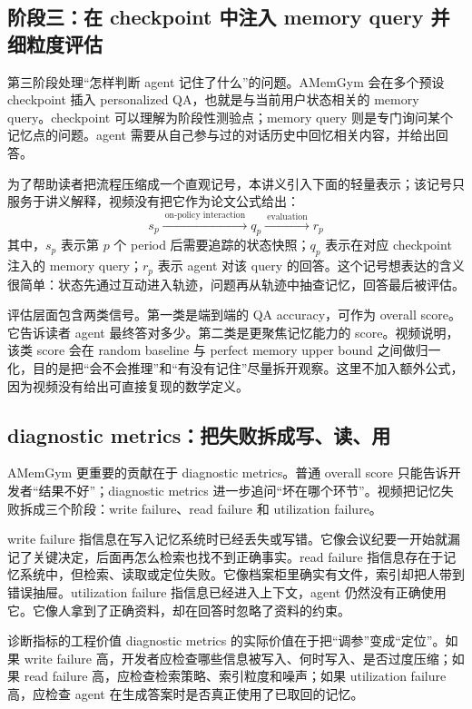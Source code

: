 \subsection{阶段三：在 checkpoint 中注入 memory query 并细粒度评估}

第三阶段处理“怎样判断 agent 记住了什么”的问题。AMemGym 会在多个预设 checkpoint 插入 personalized QA，也就是与当前用户状态相关的 memory query。checkpoint 可以理解为阶段性测验点；memory query 则是专门询问某个记忆点的问题。agent 需要从自己参与过的对话历史中回忆相关内容，并给出回答。

为了帮助读者把流程压缩成一个直观记号，本讲义引入下面的轻量表示；该记号只服务于讲义解释，视频没有把它作为论文公式给出：
\[
s_p \xrightarrow{\ \text{on-policy interaction}\ } q_p \xrightarrow{\ \text{evaluation}\ } r_p
\]
其中，\(s_p\) 表示第 \(p\) 个 period 后需要追踪的状态快照；\(q_p\) 表示在对应 checkpoint 注入的 memory query；\(r_p\) 表示 agent 对该 query 的回答。这个记号想表达的含义很简单：状态先通过互动进入轨迹，问题再从轨迹中抽查记忆，回答最后被评估。

评估层面包含两类信号。第一类是端到端的 QA accuracy，可作为 overall score。它告诉读者 agent 最终答对多少。第二类是更聚焦记忆能力的 score。视频说明，该类 score 会在 random baseline 与 perfect memory upper bound 之间做归一化，目的是把“会不会推理”和“有没有记住”尽量拆开观察。这里不加入额外公式，因为视频没有给出可直接复现的数学定义。

\subsection{diagnostic metrics：把失败拆成写、读、用}

AMemGym 更重要的贡献在于 diagnostic metrics。普通 overall score 只能告诉开发者“结果不好”；diagnostic metrics 进一步追问“坏在哪个环节”。视频把记忆失败拆成三个阶段：write failure、read failure 和 utilization failure。

write failure 指信息在写入记忆系统时已经丢失或写错。它像会议纪要一开始就漏记了关键决定，后面再怎么检索也找不到正确事实。read failure 指信息存在于记忆系统中，但检索、读取或定位失败。它像档案柜里确实有文件，索引却把人带到错误抽屉。utilization failure 指信息已经进入上下文，agent 仍然没有正确使用它。它像人拿到了正确资料，却在回答时忽略了资料的约束。

\begin{importantbox}{诊断指标的工程价值}
diagnostic metrics 的实际价值在于把“调参”变成“定位”。如果 write failure 高，开发者应检查哪些信息被写入、何时写入、是否过度压缩；如果 read failure 高，应检查检索策略、索引粒度和噪声；如果 utilization failure 高，应检查 agent 在生成答案时是否真正使用了已取回的记忆。
\end{importantbox}


